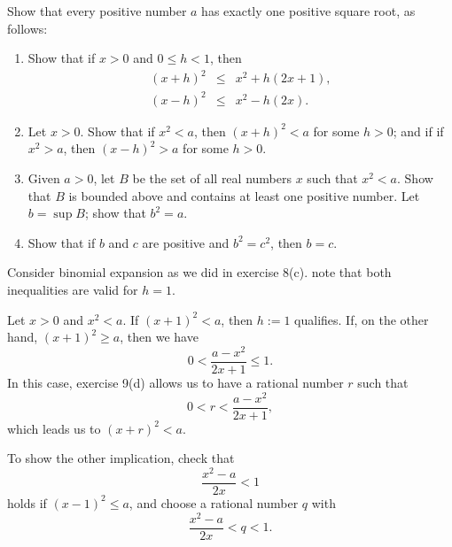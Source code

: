 \documentclass[a4paper,12pt]{article}
\begin{document}
\begin{exe}\leavevmode \par
	Show that every positive number \( a \) has exactly one positive square root,
	as follows:
	\begin{enumerate}
		\item
		      Show that if \( x>0 \)
		      and
		      \( 0 \le h <1 \),
		      then
		      \begin{eqnarray*}
			      (x+h)^2 &\le& x^2 +h(2x+1),\\
			      (x-h)^2 &\le& x^2 -h(2x).
		      \end{eqnarray*}
		      
		\item
		      Let \( x>0 \).
		      Show that if \( x^2<a \),
		      then
		      \( (x+h)^2<a \) for some \( h>0 \);
		      and if if \( x^2>a \),
		      then
		      \( (x-h)^2>a \) for some \( h>0 \).
		      
		\item
		      Given \( a>0 \),
		      let \( B \) be the set of all real numbers \( x \) such that \( x^2 <a \).
		      Show that \( B \) is bounded above and contains at least one positive number.
		      Let \( b=\sup{B} \);
		      show that \( b^2 = a \).
		      
		\item
		      Show that if \( b \) and \( c \) are positive and \( b^2 = c^2 \),
		      then \( b=c \).
	\end{enumerate}
\end{exe}\begin{sol}\leavevmode \par
	Consider binomial expansion as we did in exercise 8(c).
	note that both inequalities are valid for \( h=1\).
	
	Let
	\( x>0 \)
	and
	\( x^2<a \).
	If
	\( (x+1)^2 <a\),
	then
	\( h:=1 \)
	qualifies.
	If, on the other hand,
	\( (x+1)^2 \ge a\),
	then we have
	\begin{equation*}
		0 < \frac{a-x^2}{2x+1} \le 1.
	\end{equation*}
	In this case, exercise 9(d) allows us to have a rational number
	\( r \)
	such that
	\begin{equation*}
		0< r< \frac{a-x^2}{2x+1},
	\end{equation*}
	which leads us to
	\( (x+r)^2<a \).
	
	To show the other implication, check that
	\begin{equation*}
		\frac{x^2-a}{2x}<1
	\end{equation*}
	holds if
	\( (x-1)^2 \le a\),
	and choose a rational number
	\( q \) with
	\begin{equation*}
		\frac{x^2-a}{2x}< q <1.
	\end{equation*}
	

\end{sol}
\end{document}
